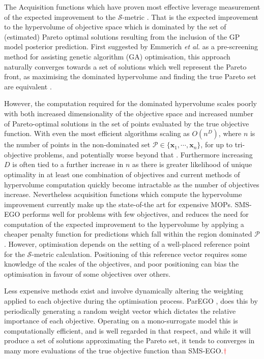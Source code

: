 \documentclass[conference]{IEEEtran}
\makeatletter
\newcommand\smsego{SMS-EGO\xspace}
\newcommand\gp{GP\xspace}
\newcommand{\bx}{\mathbf{x}}
\newcommand{\mnote}[2][\textcolor{red}{\dagger}]{$#1$\marginpar{\color{red}\raggedright\tiny$#1$
    #2}}
\newcommand*{\etal}{\textit{et al.}\@\xspace}
\makeatother
\begin{document}
The Acquisition functions which have proven most effective leverage measurement of the expected improvement to the $\mathcal{S}$-metric  \cite{emmerich2008computation}. That is the expected improvement to the hypervolume of objective space which is dominated by the set of (estimated) Pareto optimal solutions resulting from the inclusion of the \gp model posterior prediction. First suggested by Emmerich \etal  \cite{emmerich2006single} as a pre-screening method for assisting genetic algorithm (GA) optimisation, this approach naturally converges towards a set of solutions which well represent the Pareto front, as maximising the dominated hypervolume and finding the true Pareto set are equivalent \cite{fleischer2003measure}. 

However, the computation required for the dominated hypervolume scales poorly with both increased dimensionality of the objective space and increased number of Pareto-optimal solutions in the set of points evaluated by the true objective function. With even the most efficient algorithms scaling as $O(n^D)$, where $n$ is the number of points in the non-dominated set $\mathcal{P}\in\{\bx_1, \cdots, \bx_n\}$, for up to tri-objective problems, and potentially worse beyond that \cite{hupkens2014faster}. Furthermore increasing $D$ is often tied to a further increase in $n$ as there is greater likelihood of unique optimality in at least one combination of objectives and current methods of hypervolume computation quickly become intractable as the number of objectives increase. Nevertheless acquisition functions which compute the hypervolume improvement currently make up the state-of-the art for expensive MOPs. \smsego \cite{ponweiser2008multiobjective, wagner2010expected} performs well for problems with few objectives, and reduces the need for computation of the expected improvement to the hypervolume by applying a cheaper penalty function for predictions which fall within the region dominated $\mathcal{P}$. However, optimisation depends on the setting of a well-placed reference point for the $\mathcal{S}$-metric calculation. Positioning of this reference vector requires some knowledge of the scales of the objectives, and poor positioning can bias the optimisation in favour of some objectives over others. 

Less expensive methods exist and involve dynamically altering the weighting applied to each objective during the optimisation process. ParEGO \cite{knowles2006parego}, does this by periodically generating a random weight vector which dictates the relative importance of each objective. Operating on a mono-surrogate model this is computationally efficient, and is well regarded in that respect, and while it will produce a set of solutions approximating the Pareto set, it tends to converges in many more evaluations of the true objective function than \smsego.\mnote{think you nee a citation for this claim}
\end{document}
